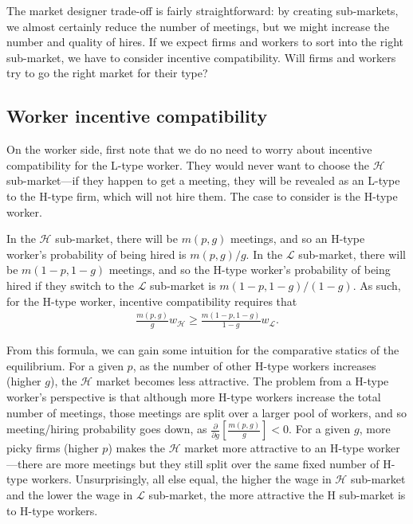 \documentclass[12pt]{article}
\newcommand{\Lsm}{$\mathcal{L}$}
\newcommand{\Hsm}{$\mathcal{H}$}
\begin{document}
The market designer trade-off is fairly straightforward:
by creating sub-markets, we almost certainly reduce the number of meetings, but we might increase the number and quality of hires.
If we expect firms and workers to sort into the right sub-market, we have to consider incentive compatibility.
Will firms and workers try to go the right market for their type?

\subsection{Worker incentive compatibility}
On the worker side, first note that we do no need to worry about incentive compatibility for the L-type worker.
They would never want to choose the \Hsm{} sub-market---if they happen to get a meeting, they will be revealed as an L-type to the H-type firm, which will not hire them.
The case to consider is the H-type worker. 

In the \Hsm{} sub-market, there will be $m(p,g)$ meetings, and so an H-type worker's probability of being hired is $m(p,g)/g$.
In the \Lsm{} sub-market, there will be $m(1 - p, 1 - g)$ meetings, and so the H-type worker's probability of being hired if they switch to the \Lsm{} sub-market is $m(1-p,1-g)/(1-g)$.
As such, for the H-type worker, incentive compatibility requires that 
\begin{align*}
  \frac{m(p,g)}{g} w_\mathcal{H} \ge \frac{m(1 - p, 1 - g)}{1 - g}w_\mathcal{L}.
\end{align*}

From this formula, we can gain some intuition for the comparative statics of the equilibrium. 
For a given $p$, as the number of other H-type workers increases (higher $g$), the \Hsm{} market becomes less attractive.
The problem from a H-type worker's perspective is that although more H-type workers increase the total number of meetings, those meetings are split over a larger pool of workers, and so meeting/hiring probability goes down, as $\frac{\partial}{\partial g}[\frac{m(p,g)}{g}] < 0$.
For a given $g$, more picky firms (higher $p$) makes the \Hsm{} market more attractive to an H-type worker---there are more meetings but they still split over the same fixed number of H-type workers.
Unsurprisingly, all else equal, the higher the wage in \Hsm{} sub-market and the lower the wage in \Lsm{} sub-market, the more attractive the H sub-market is to H-type workers. 
\end{document}
